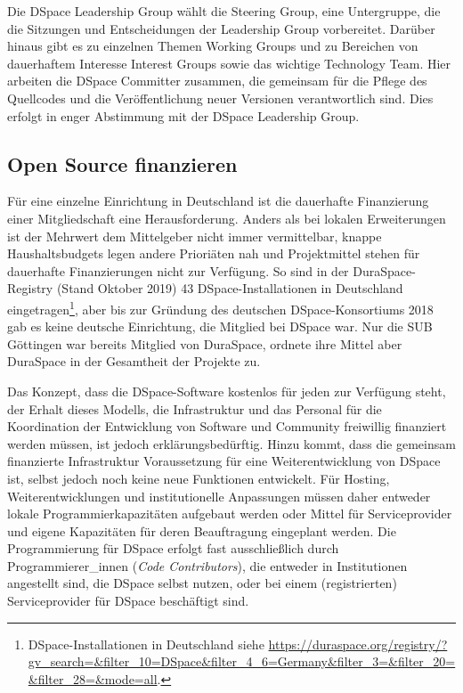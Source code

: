 \documentclass[a4paper,
fontsize=11pt,
oneside,
numbers=noperiodatend,
parskip=half-,
bibliography=totoc,
final
]{scrartcl}
\begin{document}
Die DSpace Leadership Group wählt die Steering Group, eine Untergruppe,
die die Sitzungen und Entscheidungen der Leadership Group vorbereitet.
Darüber hinaus gibt es zu einzelnen Themen Working Groups und zu
Bereichen von dauerhaftem Interesse Interest Groups sowie das wichtige
Technology Team. Hier arbeiten die DSpace Committer zusammen, die
gemeinsam für die Pflege des Quellcodes und die Veröffentlichung neuer
Versionen verantwortlich sind. Dies erfolgt in enger Abstimmung mit der
DSpace Leadership Group.

\hypertarget{open-source-finanzieren}{%
\subsection{Open Source finanzieren}\label{open-source-finanzieren}}

Für eine einzelne Einrichtung in Deutschland ist die dauerhafte
Finanzierung einer Mitgliedschaft eine Herausforderung. Anders als bei
lokalen Erweiterungen ist der Mehrwert dem Mittelgeber nicht immer
vermittelbar, knappe Haushaltsbudgets legen andere Prioriäten nah und
Projektmittel stehen für dauerhafte Finanzierungen nicht zur Verfügung.
So sind in der Dura\-Space-Registry (Stand Oktober 2019) 43
DSpace-Installationen in Deutschland eingetragen\footnote{DSpace-Installationen
  in Deutschland siehe
  \url{https://duraspace.org/registry/?gv_search=\&filter_10=DSpace\&filter_4_6=Germany\&filter_3=\&filter_20=\&filter_28=\&mode=all}.},
aber bis zur Gründung des deutschen DSpace-Konsortiums 2018 gab es keine
deutsche Einrichtung, die Mitglied bei DSpace war. Nur die SUB Göttingen
war bereits Mitglied von DuraSpace, ordnete ihre Mittel aber DuraSpace
in der Gesamtheit der Projekte zu.

Das Konzept, dass die DSpace-Software kostenlos für jeden zur Verfügung
steht, der Erhalt dieses Modells, die Infrastruktur und das Personal für
die Koordination der Entwicklung von Software und Community freiwillig
finanziert werden müssen, ist jedoch erklärungsbedürftig. Hinzu kommt,
dass die gemeinsam finanzierte Infrastruktur Voraussetzung für eine
Weiterentwicklung von DSpace ist, selbst jedoch noch keine neue
Funktionen entwickelt. Für Hosting, Weiterentwicklungen und
institutionelle Anpassungen müssen daher entweder lokale
Programmierkapazitäten aufgebaut werden oder Mittel für Serviceprovider
und eigene Kapazitäten für deren Beauftragung eingeplant werden. Die
Programmierung für DSpace erfolgt fast ausschließlich durch
Programmierer\_innen (\emph{Code Contributors}), die entweder in
Institutionen angestellt sind, die DSpace selbst nutzen, oder bei einem
(registrierten) Serviceprovider für DSpace beschäftigt sind.
\end{document}

